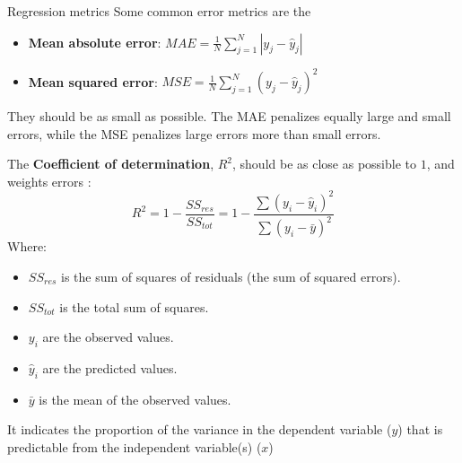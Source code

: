 \begin{frame} [allowframebreaks]{Regression metrics}\label{regression_metrics}
  Some common error metrics are the 
  \begin{itemize}
    \item \textbf{Mean absolute error}: $ MAE = \frac{1}{N}\sum_{j=1}^N| y_j - \hat{y}_j |$
    \item \textbf{Mean squared error}: $ MSE = \frac{1}{N}\sum_{j=1}^N {\left(y_j - \hat{y}_j\right)}^2$
  \end{itemize}
  They should be as small as possible. The MAE penalizes equally large and small errors, while the MSE penalizes large errors more than small errors.
  

  The \textbf{Coefficient of determination}, $R^2$, should be as close as possible to $1$, and weights errors : 
  $$R^2 = 1 - \frac{SS_{res}}{SS_{tot}}= 1 - \frac{\sum (y_i - \hat{y}_i)^2}{\sum (y_i - \bar{y})^2}$$
  Where:
  \begin{itemize}
    \item $SS_{res}$ is the sum of squares of residuals (the sum of squared errors).
    \item $SS_{tot}$ is the total sum of squares.
    \item $y_i$ are the observed values.
    \item $\hat{y}_i$ are the predicted values.
    \item $\bar{y}$ is the mean of the observed values.
  \end{itemize}

  It indicates the proportion of the variance in the dependent variable ($y$) that is predictable from the independent variable(s) ($x$)

\end{frame}

